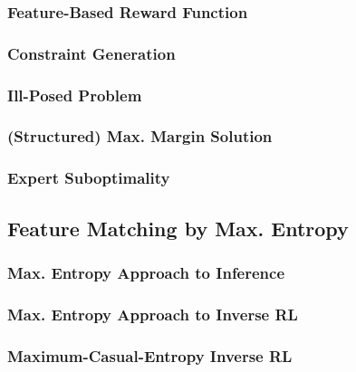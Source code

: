 			\subsubsection{Feature-Based Reward Function} %

			\subsubsection{Constraint Generation} %

			\subsubsection{Ill-Posed Problem} %

			\subsubsection{(Structured) Max. Margin Solution} %

			\subsubsection{Expert Suboptimality} %

		\subsection{Feature Matching by Max. Entropy} %

			\subsubsection{Max. Entropy Approach to Inference} %

			\subsubsection{Max. Entropy Approach to Inverse RL} %

			\subsubsection{Maximum-Casual-Entropy Inverse RL} %

